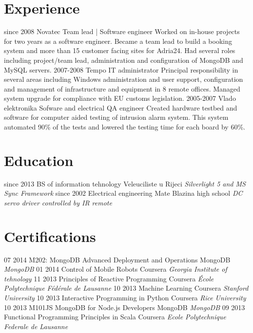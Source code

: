 \documentclass[print]{friggeri-cv}
\begin{document}
\section{Experience}

\begin{entrylist}
  \entry
    {since 2008}
    {Novatec}
    {Team lead | Software engineer}
    {Worked on in-house projects for two years as a software engineer. Became a team lead to build a booking system and more than 15 customer facing sites for Adria24. Had several roles including project/team lead, administration and configuration of MongoDB and MySQL servers.}
  \entry
    {2007-2008}
    {Tempo}
    {IT administrator}
    {Principal responsibility in several areas including Windows administration and user support, configuration and management of infrastructure and equipment in 8 remote offices. Managed system upgrade for compliance with EU customs legislation.}
  \entry
    {2005-2007}
    {Vlado elektronika}
    {Sofware and electrical QA engineer}
    {Created hardware testbed and software for computer aided testing of intrusion alarm system. This system automated 90\% of the tests and lowered the testing time for each board by 60\%.}
\end{entrylist}

\section{Education}

\begin{entrylist}
  \entry
    {since 2013}
    {BS of information tehnology}
    {Veleuciliste u Rijeci}
    {\emph{Silverlight 5 and MS Sync Framework}}
  \entry
    {since 2002}
    {Electrical engineering}
    {Mate Blazina high school}
    {\emph{DC servo driver controlled by IR remote}}
\end{entrylist}
\section{Certifications}
\begin{entrylist}
  \entry
    {07 2014} 
    {M202: MongoDB Advanced Deployment and Operations}
    {MongoDB}
    {\emph{MongoDB}}
  \entry
    {01 2014}
    {Control of Mobile Robots}
    {Coursera}
    {\emph{Georgia Institute of tehnology}}
  \entry
    {11 2013}
    {Principles of Reactive Programming}
    {Coursera}
    {\emph{École Polytechnique Fédérale de Lausanne}}
  \entry
    {10 2013}
    {Machine Learning} 
    {Coursera}
    {\emph{Stanford University}}
  \entry
    {10 2013}
    {Interactive Programming in Python}
    {Coursera}
    {\emph{Rice University}}
  \entry
    {10 2013}
    {M101JS MongoDB for Node.js Developers}
    {MongoDB}
    {\emph{MongoDB}}
  \entry
    {09 2013}
    {Functional Programming Principles in Scala}
    {Coursera}
    {\emph{Ecole Polytechnique Federale de Lausanne}}
\end{entrylist}
\end{document}
